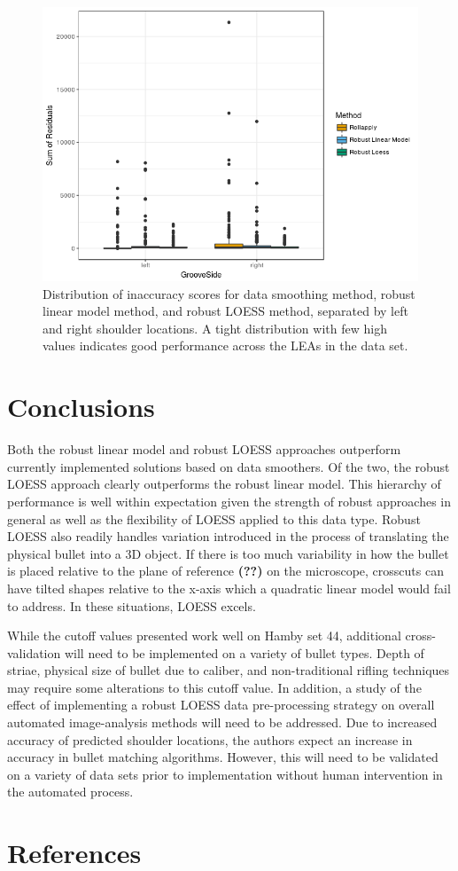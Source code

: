 \documentclass[12pt]{article}
\begin{document}
\begin{figure}[htbp]
\centering
\includegraphics{./images/afte_results.png}
\caption{Distribution of inaccuracy scores for data smoothing method,
robust linear model method, and robust LOESS method, separated by left
and right shoulder locations. A tight distribution with few high values
indicates good performance across the LEAs in the data set.}
\end{figure}

\section{Conclusions}

Both the robust linear model and robust LOESS approaches outperform
currently implemented solutions based on data smoothers. Of the two, the
robust LOESS approach clearly outperforms the robust linear model. This
hierarchy of performance is well within expectation given the strength
of robust approaches in general as well as the flexibility of LOESS
applied to this data type. Robust LOESS also readily handles variation
introduced in the process of translating the physical bullet into a 3D
object. If there is too much variability in how the bullet is placed
relative to the plane of reference \textbf{(??)} on the microscope,
crosscuts can have tilted shapes relative to the x-axis which a
quadratic linear model would fail to address. In these situations, LOESS
excels.

While the cutoff values presented work well on Hamby set 44, additional
cross-validation will need to be implemented on a variety of bullet
types. Depth of striae, physical size of bullet due to caliber, and
non-traditional rifling techniques may require some alterations to this
cutoff value. In addition, a study of the effect of implementing a
robust LOESS data pre-processing strategy on overall automated
image-analysis methods will need to be addressed. Due to increased
accuracy of predicted shoulder locations, the authors expect an increase
in accuracy in bullet matching algorithms. However, this will need to be
validated on a variety of data sets prior to implementation without
human intervention in the automated process.

\section{References}



\end{document}
